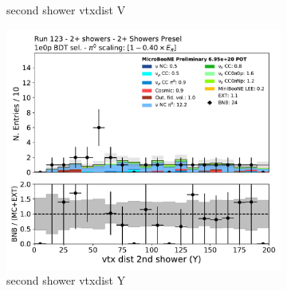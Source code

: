 \begin{figure}[H]
\begin{subfigure}{0.3\textwidth}
    \caption{second shower vtxdist V}
    \end{subfigure}
    \begin{subfigure}{0.3\textwidth}
    \includegraphics[width=1.0\textwidth]{Sidebands/Figures/TwoShr_1e0pSel/BDT/secondshower_Y_vtxdist.pdf}
    \caption{second shower vtxdist Y}
    \end{subfigure}
    \caption{} 
    \label{fig:HE_1eNp_1}
\end{figure}


